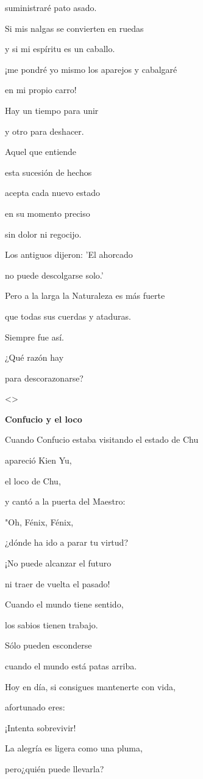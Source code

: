 suministraré pato asado.

Si mis nalgas se convierten en ruedas

y si mi espíritu es un caballo.

¡me pondré yo mismo los aparejos y cabalgaré

en mi propio carro!

Hay un tiempo para unir

y otro para deshacer.

Aquel que entiende

esta sucesión de hechos

acepta cada nuevo estado

en su momento preciso

sin dolor ni regocijo.

Los antiguos dijeron: 'El ahorcado

no puede descolgarse solo.'

Pero a la larga la Naturaleza es más fuerte

que todas sus cuerdas y ataduras.

Siempre fue así.

¿Qué razón hay

para descorazonarse?

\textless\textgreater{}

\textbf{{Confucio y el loco}}

Cuando Confucio estaba visitando el estado de Chu

apareció Kien Yu,

el loco de Chu,

y cantó a la puerta del Maestro:

"Oh, Fénix, Fénix,

¿dónde ha ido a parar tu virtud?

¡No puede alcanzar el futuro

ni traer de vuelta el pasado!

Cuando el mundo tiene sentido,

los sabios tienen trabajo.

Sólo pueden esconderse

cuando el mundo está patas arriba.

Hoy en día, si consigues mantenerte con vida,

afortunado eres:

¡Intenta sobrevivir!

La alegría es ligera como una pluma,

pero¿quién puede llevarla?

